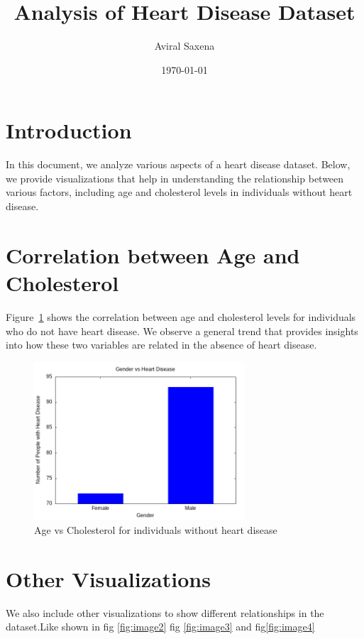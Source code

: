 \documentclass{article}
\title{Analysis of Heart Disease Dataset}
\author{Aviral Saxena}
\date{\today}
\begin{document}
	
	\maketitle
	
	\section{Introduction}
	
	In this document, we analyze various aspects of a heart disease dataset. Below, we provide visualizations that help in understanding the relationship between various factors, including age and cholesterol levels in individuals without heart disease.
	
	\section{Correlation between Age and Cholesterol}
	
	Figure~\ref{fig:age_vs_chol} shows the correlation between age and cholesterol levels for individuals who do not have heart disease. We observe a general trend that provides insights into how these two variables are related in the absence of heart disease.
	
	\begin{figure}[h!]
		\centering
		\includegraphics[width=0.7\textwidth]{ques4a.png}
		\caption{Age vs Cholesterol for individuals without heart disease}
		\label{fig:age_vs_chol}
	\end{figure}
	
	\section{Other Visualizations}
	
	We also include other visualizations to show different relationships in the dataset.Like shown in fig \ref{fig:image2} fig \ref{fig:image3} and fig\ref{fig:image4}
	
\end{document}
